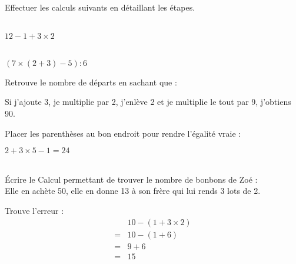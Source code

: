 

Effectuer les calculs suivants en détaillant les étapes.

\begin{multicols}{2}
    \cnt\\ 
    $12-1+3\times 2$

    \vspace*{14em}
    \columnbreak
    \cnt\\
    $(7\times (2+3)-5):6$

    \vspace*{14em}
\end{multicols}

\begin{multicols}{2}
    
    Retrouve le nombre de départs en sachant que : 
    
    Si j'ajoute 3, je multiplie par 2, j'enlève 2 et je multiplie le tout par 9, j'obtiens 90.

    \vspace*{14em}
    \columnbreak
    
    Placer les parenthèses au bon endroit pour rendre l'égalité vraie :
    
    $2+3\times 5-1=24$

    \vspace*{14em}
\end{multicols}

\begin{multicols}{2}
    \\    
    Écrire le Calcul permettant de trouver le nombre de bonbons de Zoé : \vspace*{1em} \\     
    Elle en achète 50, elle en donne 13 à son frère qui lui rends 3 lots de 2.
    \vspace*{6em}
    
    \columnbreak
    
    Trouve l'erreur :
    \begin{align*}
        &10-(1+3\times 2)\\
        =&10-(1+6)\\
        =&9+6\\
        =&15
    \end{align*}
    \vspace*{6em}
\end{multicols}


